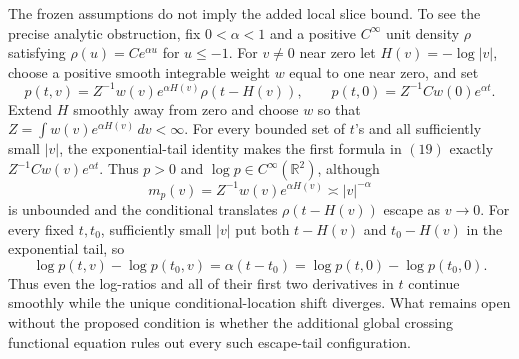 The frozen assumptions do not imply the added local slice bound.  To see the precise analytic obstruction, fix \(0<\alpha<1\) and a positive \(C^\infty\) unit density \(\rho\) satisfying \(\rho(u)=Ce^{\alpha u}\) for \(u\le-1\).  For \(v\ne0\) near zero let \(H(v)=-\log|v|\), choose a positive smooth integrable weight \(w\) equal to one near zero, and set
\[
 p(t,v)=Z^{-1}w(v)e^{\alpha H(v)}\rho(t-H(v)),\qquad
 p(t,0)=Z^{-1}Cw(0)e^{\alpha t}.
\tag{19}
\]
Extend \(H\) smoothly away from zero and choose \(w\) so that \(Z=\int w(v)e^{\alpha H(v)}\,dv<\infty\).  For every bounded set of \(t\)'s and all sufficiently small \(|v|\), the exponential-tail identity makes the first formula in \((19)\) exactly \(Z^{-1}Cw(v)e^{\alpha t}\).  Thus \(p>0\) and \(\log p\in C^\infty(\mathbb R^2)\), although
\[
 m_p(v)=Z^{-1}w(v)e^{\alpha H(v)}\asymp |v|^{-\alpha}
\tag{20}
\]
is unbounded and the conditional translates \(\rho(t-H(v))\) escape as \(v\to0\).  For every fixed \(t,t_0\), sufficiently small \(|v|\) put both \(t-H(v)\) and \(t_0-H(v)\) in the exponential tail, so
\[
 \log p(t,v)-\log p(t_0,v)=\alpha(t-t_0)
 =\log p(t,0)-\log p(t_0,0).
\tag{21}
\]
Thus even the log-ratios and all of their first two derivatives in \(t\) continue smoothly while the unique conditional-location shift diverges.  What remains open without the proposed condition is whether the additional global crossing functional equation rules out every such escape-tail configuration.